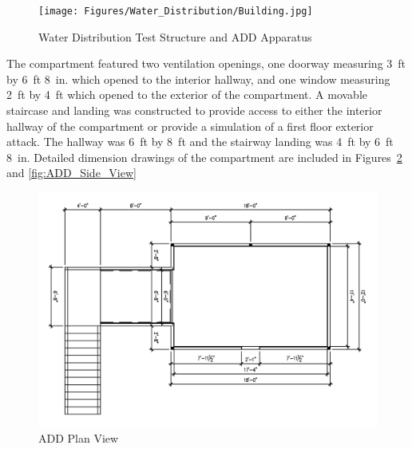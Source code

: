 \documentclass{book}
\begin{document}
\begin{figure}[!ht]
	\centering
	\texttt{[image: Figures/Water\_Distribution/Building.jpg]}
	\caption{Water Distribution Test Structure and ADD Apparatus}
	\label{fig:Water_Distribution_Test_Structure_and_ADD_Apparatus}
\end{figure}

The compartment featured two ventilation openings, one doorway measuring 3~ft by 6~ft 8~in. which opened to the interior hallway, and one window measuring 2~ft by 4~ft which opened to the exterior of the compartment. A movable staircase and landing was constructed to provide access to either the interior hallway of the compartment or provide a simulation of a first floor exterior attack. The hallway was 6~ft by 8~ft and the stairway landing was 4~ft by 6~ft 8~in. Detailed dimension drawings of the compartment are included in Figures~\ref{fig:ADD_Top_View} and \ref{fig:ADD_Side_View}

\begin{figure}[!ht]
	\centering
	\includegraphics[width=\columnwidth]{Figures/Water_Distribution/ADDtopviewprint}
	\caption{ADD Plan View}
	\label{fig:ADD_Top_View}
\end{figure}
\end{document}
